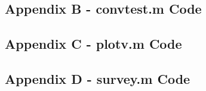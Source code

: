\documentclass[10pt]{article}
\begin{document}
\subsection*{Appendix B - convtest.m Code}


\pagebreak

\subsection*{Appendix C - plotv.m Code}


\pagebreak

\subsection*{Appendix D - survey.m Code}


\pagebreak
\end{document}
